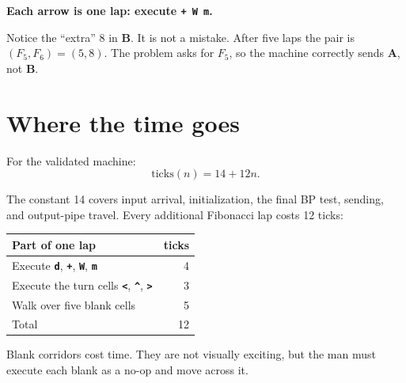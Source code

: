 \documentclass[11pt,a4paper]{article}
\newcommand{\op}[1]{\texttt{\bfseries #1}}
\newcommand{\reg}[1]{\textsf{\bfseries #1}}
\newcommand{\Fib}[1]{F_{#1}}
\begin{document}
\begin{center}
\small\textbf{Each arrow is one lap: execute \op{+ W m}.}\par\medskip
{}
\end{center}

\begin{bluebox}
  Notice the ``extra'' \(8\) in \reg{B}. It is not a mistake.
  After five laps the pair is \((\Fib5,\Fib6)=(5,8)\).
  The problem asks for \(\Fib5\), so the machine correctly sends \reg{A},
  not \reg{B}.
\end{bluebox}

\section{Where the time goes}

For the validated machine:
\[
  \text{ticks}(n)=14+12n.
\]

The constant 14 covers input arrival, initialization, the final BP test,
sending, and output-pipe travel. Every additional Fibonacci lap costs 12
ticks:

\begin{center}
\begin{tabular}{l|r}
  \toprule
  \textbf{Part of one lap} & \textbf{ticks}\\
  \midrule
  Execute \op{d}, \op{+}, \op{W}, \op{m} & 4\\
  Execute the turn cells \op{<}, \op{\string^}, \op{>} & 3\\
  Walk over five blank cells & 5\\
  \midrule
  Total & 12\\
  \bottomrule
\end{tabular}
\end{center}

Blank corridors cost time. They are not visually exciting, but the man must
execute each blank as a no-op and move across it.
\end{document}
